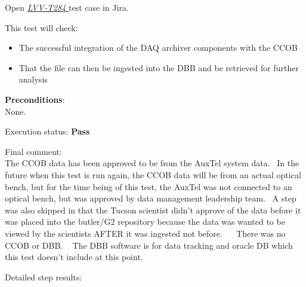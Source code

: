 \documentclass[DM,lsstdraft,STR,toc]{lsstdoc}
\providecommand{\tightlist}{
  \setlength{\itemsep}{0pt}\setlength{\parskip}{0pt}}
\begin{document}
Open  \href{https://jira.lsstcorp.org/secure/Tests.jspa#/testCase/LVV-T284}{\textit{ LVV-T284 } }
test case in Jira.

    This test will check:

\begin{itemize}
\tightlist
\item
  The successful integration of the DAQ archiver components with the
  CCOB
\item
  That the file can then be ingested into the DBB and be retrieved for
  further analysis
\end{itemize}


    \textbf{ Preconditions}:\\
    None.


    Execution status: {\bf Pass }

    Final comment:\\The CCOB data has been approved to be from the AuxTel system data. ~In
the future when this test is run again, the CCOB data will be from an
actual optical bench, but for the time being of this test, the AuxTel
was not connected to an optical bench, but was approved by data
management leadership team. ~A step was also skipped in that the Tucson
scientist didn't approve of the data before it was placed into the
butler/G2 repository because the data was wanted to be viewed by the
scientists AFTER it was ingested not before. ~ ~There was no CCOB or
DBB. ~ The DBB software is for data tracking and oracle DB which this
test doesn't include at this point.~~



    Detailed step results:
\end{document}
